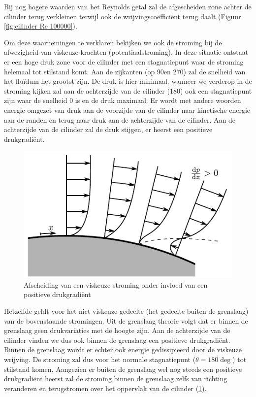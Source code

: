 Bij nog hogere waarden van het Reynolds getal zal de afgescheiden zone achter de cilinder terug verkleinen terwijl ook de wrijvingscoëfficiënt terug daalt (Figuur \ref{fig:cilinder Re 100000}).

Om deze waarnemingen te verklaren bekijken we ook de stroming bij de afwezigheid van viskeuze krachten (potentiaalstroming). In deze situatie ontstaat er een hoge druk zone voor de cilinder met een stagnatiepunt waar de stroming helemaal tot stilstand komt. Aan de zijkanten (op 90\deg en 270\deg) zal de snelheid van het fluïdum het grootst zijn. De druk is hier minimaal. wanneer we verderop in de stroming kijken zal aan de achterzijde van de cilinder (180\deg) ook een stagnatiepunt zijn waar de snelheid $0$ is en de druk maximaal. Er wordt met andere woorden energie omgezet van druk aan de voorzijde van de cilinder naar kinetische energie aan de randen en terug naar druk aan de achterzijde van de cilinder. Aan de achterzijde van de cilinder zal de druk stijgen, er heerst een positieve drukgradiënt.
\begin{figure}[htb]
	\centering
	\includegraphics{fig/uitwendige_stroming/loshechting}
	\caption{Afscheiding van een viskeuze stroming onder invloed van een positieve drukgradiënt}
	\label{fig:afscheiding}
\end{figure}

Hetzelfde geldt voor het niet viskeuze gedeelte (het gedeelte buiten de grenslaag) van de bovenstaande stromingen. Uit de grenslaag theorie volgt dat er binnen de grenslaag geen drukvariaties met de hoogte zijn. Aan de achterzijde van de cilinder vinden we dus ook binnen de grenslaag een positieve drukgradiënt. Binnen de grenslaag wordt er echter ook energie gedissipieerd door de viskeuze wrijving. De stroming zal dus voor het normale stagnatiepunt ($\theta = 180\deg$) tot stilstand komen. Aangezien er buiten de grenslaag wel nog steeds een positieve drukgradiënt heerst zal de stroming binnen de grenslaag zelfs van richting veranderen en terugstromen over het oppervlak van de cilinder (\ref{fig:afscheiding}).

